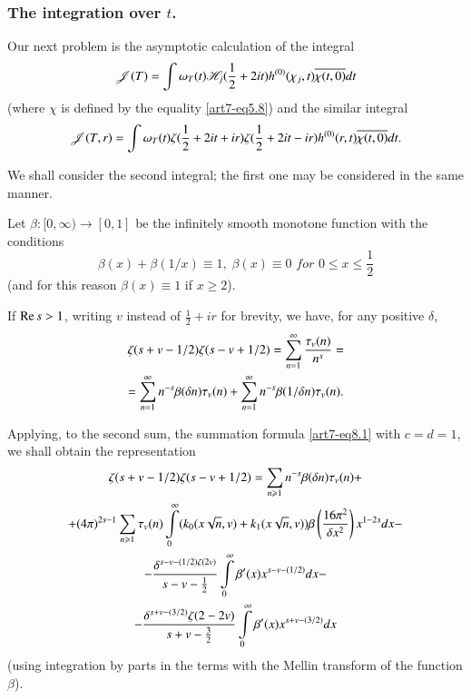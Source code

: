 \setcounter{section}{2}
\subsubsection{The integration over $t$.}\label{art7-subsubsec2.7.2}
Our next problem is the asymptotic calculation of the integral
\setcounter{section}{8}
\begin{equation}
\mathscr{J} (T) = \int \omega_T (t) \mathscr{H}_j (\frac{1}{2} + 2 it) h^{(0)} (\chi_j, t) \overline{\chi (t, 0)} dt \label{art7-eq8.3}
\end{equation}
(where $\chi$ is defined by the equality \eqref{art7-eq5.8}) and the similar integral 
\begin{equation}
\mathscr{J} (T, r) = \int \omega_T (t) \zeta (\frac{1}{2} + 2 it + ir) \zeta (\frac{1}{2} + 2 i t - ir) h^{(0)} (r,t) \overline{\chi (t,0)} dt. 
\label{art7-eq8.4}
\end{equation}

We shall consider the second integral; the first one may be considered in the same manner. 

Let $\beta : [0, \infty) \to [0,1]$ be the infinitely smooth monotone function with the conditions
\begin{equation}
\beta(x) + \beta (1/x) \equiv 1, \; \beta (x) \equiv 0 \textit{ for  } 0 \leqslant x \leqslant \frac{1}{2}
\label{art7-eq8.5}
\end{equation}
(and for this reason $\beta (x) \equiv 1$ if $x \geqslant 2$).

If $\operatorname{Re} s >1$, writing $v$ instead of $\frac{1}{2} + ir $ for brevity, we have, for any positive $\delta$, 
\begin{gather}
\zeta (s + v - 1/2) \zeta (s- v+ 1/2) = \sum\limits^\infty_{n=1} \frac{\tau_v (n)}{n^s} = \label{art7-eq8.6}\\
= \sum\limits^\infty_{n=1} n^{-s} \beta (\delta n) \tau_v (n) + \sum\limits^\infty_{n=1} n^{-s} \beta (1/\delta n) \tau_v (n). \notag
\end{gather}
 
Applying, to the second sum, the summation formula \eqref{art7-eq8.1} with $c = d =1$, we shall obtain the representation 
\begin{gather}
\zeta (s+ v -1/2) \zeta (s - v+ 1/2) = \sum\limits_{n \geqslant 1} n^{-s} \beta (\delta n) \tau_v (n)+\label{art7-eq8.7}\\
+(4\pi)^{2s-1} \sum\limits_{n \geqslant 1} \tau_v (n) \int\limits^\infty_0 (k_0 (x \sqrt{n}, v) + k_1 (x \sqrt{n}, v)) \beta \left(\frac{16 \pi^2}{\delta x^2} \right) x^{1-2s} dx -\notag\\
-\frac{\delta^{s-v-(1/2) \zeta (2v)}}{s-v-\frac{1}{2}} \int\limits^\infty_0 \beta' (x) x^{s-v-(1/2)} dx - \notag\\
- \frac{\delta^{s+v - (3/2)} \zeta (2 -2 v)}{s+v -\frac{3}{2}} \int\limits^\infty_0 \beta' (x) x^{s+v-(3/2)} dx \notag
\end{gather}\pageoriginale 
(using integration by parts in the terms with the Mellin transform of the function $\beta$).

